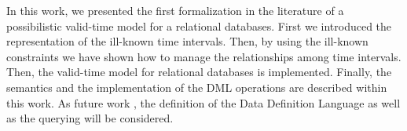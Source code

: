 In this work, we presented the first formalization in the literature of a possibilistic valid-time model for a relational databases. First we introduced the representation of the ill-known time intervals. Then, by using the ill-known constraints we have shown how to manage the relationships among time intervals. Then, the valid-time model for relational databases is implemented. Finally, the semantics and the implementation of the DML operations are described within this work. As future work , the definition of the Data Definition Language as well as the querying will be considered.
